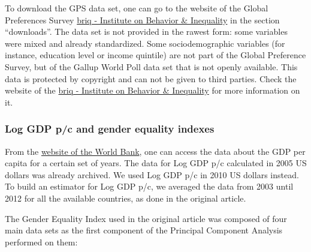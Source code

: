 \documentclass[
]{article}
\begin{document}
To download the GPS data set, one can go to the website of the Global
Preferences Survey
\href{https://www.briq-institute.org/global-preferences/home}{briq -
Institute on Behavior \& Inequality} in the section ``downloads''. The
data set is not provided in the rawest form: some variables were mixed
and already standardized. Some sociodemographic variables (for instance,
education level or income quintile) are not part of the Global
Preference Survey, but of the Gallup World Poll data set that is not
openly available. This data is protected by copyright and can not be
given to third parties. Check the website of the
\href{https://www.briq-institute.org/global-preferences/home}{briq -
Institute on Behavior \& Inequality} for more information on it.

\hypertarget{log-gdp-pc-and-gender-equality-indexes}{%
\subsubsection{Log GDP p/c and gender equality
indexes}\label{log-gdp-pc-and-gender-equality-indexes}}

From the \href{https://data.worldbank.org/indicator/}{website of the
World Bank}, one can access the data about the GDP per capita for a
certain set of years. The data for Log GDP p/c calculated in 2005 US
dollars was already archived. We used Log GDP p/c in 2010 US dollars
instead. To build an estimator for Log GDP p/c, we averaged the data
from 2003 until 2012 for all the available countries, as done in the
original article.

The Gender Equality Index used in the original article was composed of
four main data sets as the first component of the Principal Component
Analysis performed on them:
\end{document}
